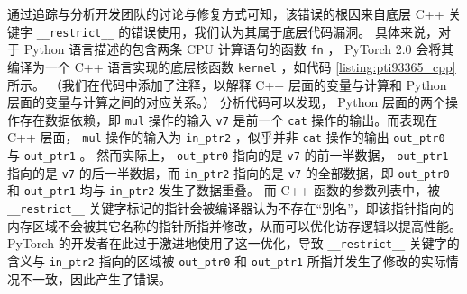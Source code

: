 通过追踪与分析开发团队的讨论与修复方式可知，该错误的根因来自底层 C++ 关键字 \texttt{\_\_restrict\_\_} 的错误使用，我们认为其属于底层代码漏洞。
具体来说，对于 Python 语言描述的包含两条 CPU 计算语句的函数 \texttt{fn} ， PyTorch 2.0 会将其编译为一个 C++ 语言实现的底层核函数 \texttt{kernel} ，如代码 \ref{listing:pti93365_cpp} 所示。
（我们在代码中添加了注释，以解释 C++ 层面的变量与计算和 Python 层面的变量与计算之间的对应关系。）
分析代码可以发现， Python 层面的两个操作存在数据依赖，即 \texttt{mul} 操作的输入 \texttt{v7} 是前一个 \texttt{cat} 操作的输出。而表现在 C++ 层面， \texttt{mul} 操作的输入为 \texttt{in\_ptr2} ，似乎并非 \texttt{cat} 操作的输出 \texttt{out\_ptr0} 与 \texttt{out\_ptr1} 。
然而实际上， \texttt{out\_ptr0} 指向的是 \texttt{v7} 的前一半数据， \texttt{out\_ptr1} 指向的是 \texttt{v7} 的后一半数据，而 \texttt{in\_ptr2} 指向的是 \texttt{v7} 的全部数据，即 \texttt{out\_ptr0} 和 \texttt{out\_ptr1} 均与 \texttt{in\_ptr2} 发生了数据重叠。
而 C++ 函数的参数列表中，被 \texttt{\_\_restrict\_\_} 关键字标记的指针会被编译器认为不存在“别名”，即该指针指向的内存区域不会被其它名称的指针所指并修改，从而可以优化访存逻辑以提高性能。
PyTorch 的开发者在此过于激进地使用了这一优化，导致 \texttt{\_\_restrict\_\_} 关键字的含义与 \texttt{in\_ptr2} 指向的区域被 \texttt{out\_ptr0} 和 \texttt{out\_ptr1} 所指并发生了修改的实际情况不一致，因此产生了错误。

